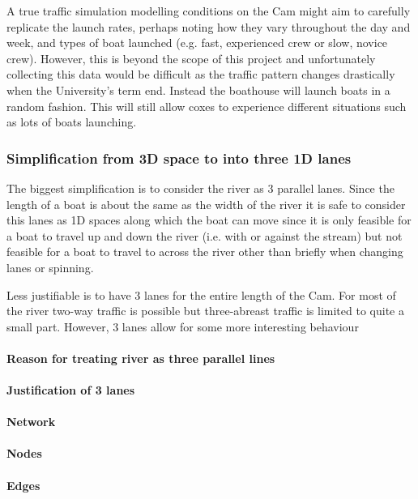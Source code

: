       A true traffic simulation modelling conditions on the Cam might aim to carefully replicate the launch rates, perhaps noting how they vary throughout the day and week, and types of boat launched (e.g. fast, experienced crew or slow, novice crew). However, this is beyond the scope of this project and unfortunately collecting this data would be difficult as the traffic pattern changes drastically when the University's term end. Instead the boathouse will launch boats in a random fashion. This will still allow coxes to experience different situations such as lots of boats launching.
      
      \subsubsection{Simplification from 3D space to into three 1D lanes}
      
      The biggest simplification is to consider the river as 3 parallel lanes. Since the length of a boat is about the same as the width of the river it is safe to consider this lanes as 1D spaces along which the boat can move since it is only feasible for a boat to travel up and down the river (i.e. with or against the stream) but not feasible for a boat to travel to across the river other than briefly when changing lanes or spinning.
      
      Less justifiable is to have 3 lanes for the entire length of the Cam. For most of the river two-way traffic is possible but three-abreast traffic is limited to quite a small part. However, 3 lanes allow for some more interesting behaviour 
      
      
        \paragraph{Reason for treating river as three parallel lines}
        \paragraph{Justification of 3 lanes}
        \paragraph{Network}
        \paragraph{Nodes}
        \paragraph{Edges}
        
